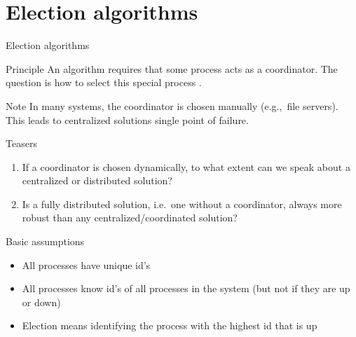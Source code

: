 \section{Election algorithms}
\begin{slide}{Election algorithms}
  \begin{block}{Principle} 
    An algorithm requires that some process acts as a coordinator. The question is how to select this special
    process .
  \end{block}
  \begin{block}{Note} 
    In many systems, the coordinator is chosen manually (e.g.,\ file servers). This leads to centralized
    solutions \mathexpr{\Rightarrow} single point of failure.
  \end{block}
  \begin{block}{Teasers}
    \begin{enumerate}
    \item If a coordinator is chosen dynamically, to what extent can we speak about a centralized or
      distributed solution? 
    \item Is a fully distributed solution, i.e.\ one without a coordinator, always more robust than any
      centralized/coordinated solution?
    \end{enumerate}
  \end{block}
\end{slide}
\begin{slide}{Basic assumptions}
  \begin{block}{}
    \begin{itemize}
    \item All processes have unique id's
    \item All processes know id's of all processes in the system (but not if they are up or down)
    \item Election means identifying the process with the highest id that is up
    \end{itemize}
  \end{block}
\end{slide}
